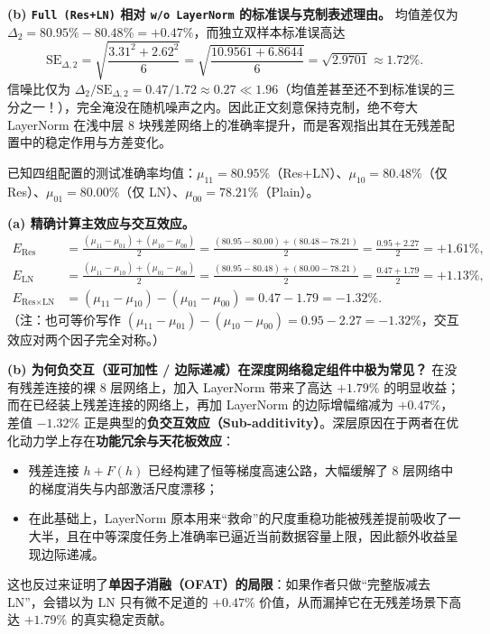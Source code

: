 \textbf{(b) \texttt{Full (Res+LN)} 相对 \texttt{w/o LayerNorm} 的标准误与克制表述理由。}
均值差仅为 $\Delta_2 = 80.95\% - 80.48\% = \mathbf{+0.47\%}$，而独立双样本标准误高达
\[
  \mathrm{SE}_{\Delta, 2}
  = \sqrt{\frac{3.31^2 + 2.62^2}{6}}
  = \sqrt{\frac{10.9561 + 6.8644}{6}}
  = \sqrt{2.9701} \approx \mathbf{1.72\%}.
\]
信噪比仅为 $\Delta_2 / \mathrm{SE}_{\Delta, 2} = 0.47 / 1.72 \approx \mathbf{0.27} \ll 1.96$（均值差甚至还不到标准误的三分之一！），完全淹没在随机噪声之内。因此正文刻意保持克制，绝不夸大 LayerNorm 在浅中层 8 块残差网络上的准确率提升，而是客观指出其在无残差配置中的稳定作用与方差变化。


已知四组配置的测试准确率均值：$\mu_{11} = 80.95\%$（Res+LN）、$\mu_{10} = 80.48\%$（仅 Res）、$\mu_{01} = 80.00\%$（仅 LN）、$\mu_{00} = 78.21\%$（Plain）。

\textbf{(a) 精确计算主效应与交互效应。}
\begin{align*}
  E_{\text{Res}}
  &= \frac{(\mu_{11} - \mu_{01}) + (\mu_{10} - \mu_{00})}{2}
   = \frac{(80.95 - 80.00) + (80.48 - 78.21)}{2}
   = \frac{0.95 + 2.27}{2} = \mathbf{+1.61\%}, \\
  E_{\text{LN}}
  &= \frac{(\mu_{11} - \mu_{10}) + (\mu_{01} - \mu_{00})}{2}
   = \frac{(80.95 - 80.48) + (80.00 - 78.21)}{2}
   = \frac{0.47 + 1.79}{2} = \mathbf{+1.13\%}, \\
  E_{\text{Res}\times\text{LN}}
  &= (\mu_{11} - \mu_{10}) - (\mu_{01} - \mu_{00})
   = 0.47 - 1.79 = \mathbf{-1.32\%}.
\end{align*}
（注：也可等价写作 $(\mu_{11} - \mu_{01}) - (\mu_{10} - \mu_{00}) = 0.95 - 2.27 = -1.32\%$，交互效应对两个因子完全对称。）

\textbf{(b) 为何负交互（亚可加性 / 边际递减）在深度网络稳定组件中极为常见？}
在没有残差连接的裸 8 层网络上，加入 LayerNorm 带来了高达 $+1.79\%$ 的明显收益；而在已经装上残差连接的网络上，再加 LayerNorm 的边际增幅缩减为 $+0.47\%$，差值 $-1.32\%$ 正是典型的\textbf{负交互效应（Sub-additivity）}。深层原因在于两者在优化动力学上存在\textbf{功能冗余与天花板效应}：
\begin{itemize}
  \item 残差连接 $h + F(h)$ 已经构建了恒等梯度高速公路，大幅缓解了 8 层网络中的梯度消失与内部激活尺度漂移；
  \item 在此基础上，LayerNorm 原本用来“救命”的尺度重稳功能被残差提前吸收了一大半，且在中等深度任务上准确率已逼近当前数据容量上限，因此额外收益呈现边际递减。
\end{itemize}
这也反过来证明了\textbf{单因子消融（OFAT）的局限}：如果作者只做“完整版减去 LN”，会错以为 LN 只有微不足道的 $+0.47\%$ 价值，从而漏掉它在无残差场景下高达 $+1.79\%$ 的真实稳定贡献。

